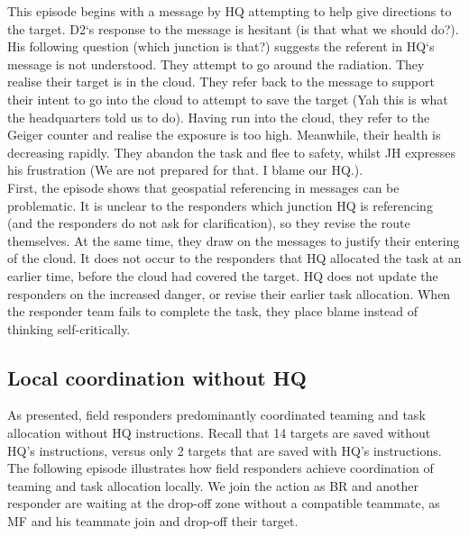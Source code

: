 This episode begins with a message by HQ attempting to help give directions to the target. D2`s response to the message is hesitant (is that what we should do?). His following question (which junction is that?) suggests the referent in HQ`s message is not understood. They attempt to go around the radiation. They realise their target is in the cloud. They refer back to the message to support their intent to go into the cloud to attempt to save the target (Yah this is what the headquarters told us to do). Having run into the cloud, they refer to the Geiger counter and realise the exposure is too high. Meanwhile, their health is decreasing rapidly. They abandon the task and flee to safety, whilst JH expresses his frustration (We are not prepared for that. I blame our HQ.).\\

First, the episode shows that geospatial referencing in messages can be problematic. It is unclear to the responders which junction HQ is referencing (and the responders do not ask for clarification), so they revise the route themselves. At the same time, they draw on the messages to justify their entering of the cloud. It does not occur to the responders that HQ allocated the task at an earlier time, before the cloud had covered the target. HQ does not update the responders on the increased danger, or revise their earlier task allocation. When the responder team fails to complete the task, they place blame instead of thinking self-critically.\\



\subsection{Local coordination without HQ}\label{sec:s1localcoordination}
As presented, field responders predominantly coordinated teaming and task allocation without HQ instructions. Recall that 14 targets are saved without HQ's instructions, versus only 2 targets that are saved with HQ's instructions. The following episode illustrates how field responders achieve coordination of teaming and task allocation locally. We join the action as BR and another responder are waiting at the drop-off zone without a compatible teammate, as MF and his teammate join and drop-off their target.\\

